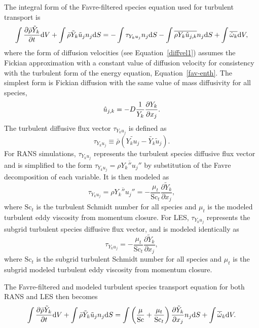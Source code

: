 The integral form of the Favre-filtered species equation used for
turbulent transport is
%
\begin{equation}
  \int {{\partial \bar{\rho} \tilde{Y}_k} \over {\partial t}} {\rm d}V
  + \int \bar{\rho} \tilde{Y}_k \tilde{u}_j n_j {\rm d}S = 
  - \int \tau_{Y_k u_j} n_j {\rm d}S
  - \int \overline{\rho Y_k \hat{u}_{j,k}} n_j {\rm d}S + 
   \int \overline{\dot{\omega}_k} {\rm d}V,
\label{fav-species}
\end{equation}
%
where the form of diffusion velocities (see Equation~\ref{diffvel1}) assumes 
the Fickian approximation with a constant value of diffusion velocity 
for consistency with the turbulent form of the energy equation, 
Equation~\ref{fav-enth}. The simplest form is Fickian diffusion with the same  
value of mass diffusivity for all species,  
%
\begin{equation}
  \hat{u}_{j,k}= - D {1 \over {Y_k}} 
                   {{\partial Y_k} \over {\partial x_j}} .
  \label{diffvel1}
\end{equation}
%
The turbulent diffusive flux vector $\tau_{Y_k u_j}$ is defined as
%
\begin{equation}
\tau_{Y_k u_j} \equiv \bar{\rho} \left( \widetilde{Y_k u_j} - 
     \tilde{Y_k} \tilde{u}_j \right).
\end{equation}
%
For RANS simulations, $\tau_{Y_k u_j}$ represents the turbulent species 
diffusive flux vector and is simplified to the form 
$\tau_{Y_k u_j} = \overline{\rho Y_k'' u_j''}$ by substitution of the 
Favre decomposition of each variable.  It is then modeled as
%
\begin{equation}
\tau_{Y_k u_j} = \overline{\rho Y_k'' u_j''}
    = - \frac{\mu_t}{\mathrm{Sc}_t} \frac{\partial \tilde{Y}_k}{\partial x_j}, 
\end{equation}
%
where $\mathrm{Sc}_t$ is the turbulent Schmidt number for all species
and $\mu_t$ is the modeled turbulent eddy viscosity from momentum closure.
For LES, $\tau_{Y_k u_j}$ represents the subgrid turbulent species diffusive 
flux vector, and is modeled identically as
%
\begin{equation}
\tau_{Y_k u_j} = - \frac{\mu_t}{\mathrm{Sc}_t} \frac{\partial 
     \tilde{Y}_k}{\partial x_j}, 
\end{equation}
%
where $\mathrm{Sc}_t$ is the subgrid turbulent Schmidt number for all
species and $\mu_t$ is the subgrid modeled turbulent eddy viscosity from
momentum closure.

The Favre-filtered and modeled turbulent species transport equation
for both RANS and LES then becomes
%
\begin{equation}
  \int {{\partial \bar{\rho} \tilde{Y}_k} \over {\partial t}} {\rm d}V
  + \int \bar{\rho} \tilde{Y}_k \tilde{u}_j n_j {\rm d}S = 
   \int \left( {\mu \over {\rm Sc}} 
              + {{\mu_t} \over {{\rm Sc}_t}}  \right)
          {{\partial \tilde{Y}_k} \over
           {\partial x_j}} n_j {\rm d}S + 
   \int \overline{\dot{\omega}}_k {\rm d}V .
\label{mod-species}
\end{equation}


